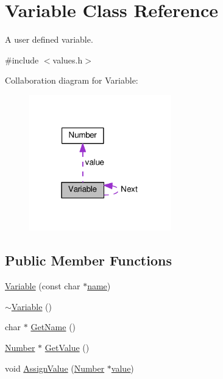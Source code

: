 \hypertarget{classVariable}{}\section{Variable Class Reference}
\label{classVariable}


A user defined variable.  




{\ttfamily \#include $<$values.\+h$>$}



Collaboration diagram for Variable\+:
\nopagebreak
\begin{figure}[H]
\begin{center}
\leavevmode
\includegraphics[width=175pt]{db/d48/classVariable__coll__graph}
\end{center}
\end{figure}
\subsection*{Public Member Functions}
\begin{DoxyCompactItemize}
\item 
\hyperlink{classVariable_a230014211eb4309bcec965df5799a7eb}{Variable} (const char $\ast$\hyperlink{classVariable_a821b09d0920ea8685fc2e4c804106416}{name})
\item 
\hyperlink{classVariable_acfc14d0ad77af53025f890b4d3a7745a}{$\sim$\+Variable} ()
\item 
char $\ast$ \hyperlink{classVariable_accf221d35cec8a9707e84891b715fb6c}{Get\+Name} ()
\item 
\hyperlink{structNumber}{Number} $\ast$ \hyperlink{classVariable_adb77b2681374245b5d606a1d149d0d91}{Get\+Value} ()
\item 
void \hyperlink{classVariable_ad8c997ea0edab8bf72ada85963800211}{Assign\+Value} (\hyperlink{structNumber}{Number} $\ast$\hyperlink{classVariable_a97f7747dc30797f29b247e26ca585c94}{value})
\end{DoxyCompactItemize}
